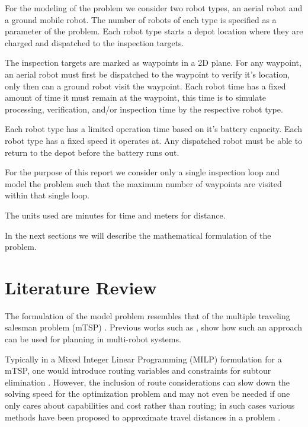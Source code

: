 \documentclass{article}
\begin{document}
		For the modeling of the problem we consider two robot types, an aerial robot and a ground mobile robot. 
		The number of robots of each type is specified as a parameter of the problem.
		Each robot type starts a depot location where they are charged and dispatched to the inspection targets.

		The inspection targets are marked as waypoints in a 2D plane.
		For any waypoint, an aerial robot must first be dispatched to the waypoint to verify it's location, only then can a ground robot visit the waypoint.
		Each robot time has a fixed amount of time it must remain at the waypoint, this time is to simulate processing, verification, and/or inspection time by the respective robot type.

		Each robot type has a limited operation time based on it's battery capacity.
		Each robot type has a fixed speed it operates at.
		Any dispatched robot must be able to return to the depot before the battery runs out.

		For the purpose of this report we consider only a single inspection loop and model the problem such that the maximum number of waypoints are visited within that single loop.

		The units used are minutes for time and meters for distance.

		In the next sections we will describe the mathematical formulation of the problem.

	

	\section{Literature Review}\label{lit_review}

		The formulation of the model problem resembles that of the multiple traveling salesman problem (mTSP) .
		Previous works such as \cite{oberlin2009transformation} \cite{albert2017uav}, show how such an approach can be used for planning in multi-robot systems.

		Typically in a Mixed Integer Linear Programming (MILP) formulation for a mTSP, one would introduce routing variables and constraints for subtour elimination \cite{bektas2006multiple}. 
		However, the inclusion of route considerations can slow down the solving speed for the optimization problem and may not even be needed if one only cares about capabilities and cost rather than routing; in such cases various methods have been proposed to approximate travel distances in a problem \cite{NICOLA201967}.
\end{document}
